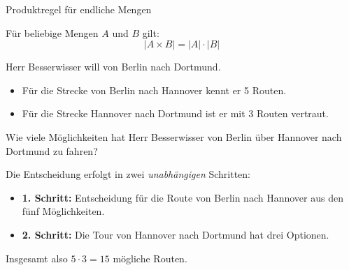 \documentclass[12pt,ngerman,a4paper,ignorenonframetext,]{beamer}
\providecommand{\tightlist}{%
  \setlength{\itemsep}{0pt}\setlength{\parskip}{0pt}}
\begin{document}
\begin{frame}{Produktregel für endliche Mengen}
\protect\hypertarget{produktregel-fur-endliche-mengen}{}


\begin{Satz}

Für beliebige Mengen \(A\) und \(B\) gilt:\vspace*{-.7em}
\begin{equation*} 
    |A \times B| = |A| \cdot |B| 
\end{equation*}

\end{Satz}


\begin{Beispiel}[Routenplanung]

Herr Besserwisser will von Berlin nach Dortmund.

\begin{itemize}
\tightlist
\item
  Für die Strecke von Berlin nach Hannover kennt er 5 Routen.
\item
  Für die Strecke Hannover nach Dortmund ist er mit 3 Routen vertraut.
\end{itemize}

Wie viele Möglichkeiten hat Herr Besserwisser von Berlin über Hannover
nach Dortmund zu fahren?

Die Entscheidung erfolgt in zwei \emph{unabhängigen} Schritten:

\begin{itemize}
\tightlist
\item
  \textbf{1. Schritt:} Entscheidung für die Route von Berlin nach
  Hannover aus den fünf Möglichkeiten.
\item
  \textbf{2. Schritt:} Die Tour von Hannover nach Dortmund hat drei
  Optionen.
\end{itemize}

Insgesamt also \(5 \cdot 3 = 15\) mögliche Routen.

\end{Beispiel}

\end{frame}
\end{document}
